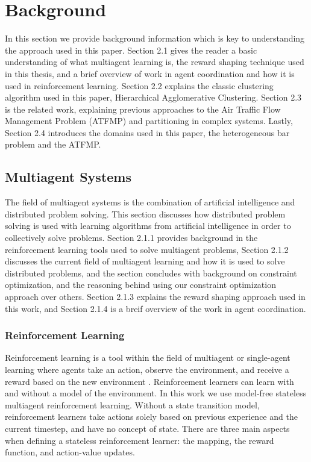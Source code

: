 \documentclass[onehalf,11pt]{beavtex}
\begin{document}
\chapter{Background}
In this section we provide background information which is key to understanding the approach used in this paper. Section 2.1 gives the reader a basic understanding of what multiagent learning is, the reward shaping technique used in this thesis, and a brief overview of work in agent coordination and how it is used in reinforcement learning. Section 2.2 explains the classic clustering algorithm used in this paper, Hierarchical Agglomerative Clustering. Section 2.3 is the related work, explaining previous approaches to the Air Traffic Flow Management Problem (ATFMP) and partitioning in complex systems. Lastly, Section 2.4 introduces the domains used in this paper, the heterogeneous bar problem and the ATFMP.

\section{Multiagent Systems}

The field of multiagent systems is the combination of artificial intelligence and distributed problem solving. This section discusses how distributed problem solving is used with learning algorithms from artificial intelligence in order to collectively solve problems. Section 2.1.1 provides background in the reinforcement learning tools used to solve multiagent problems, Section 2.1.2 discusses the current field of multiagent learning and how it is used to solve distributed problems, and the section concludes with background on constraint optimization, and the reasoning behind using our constraint optimization approach over others. Section 2.1.3 explains the reward shaping approach used in this work, and Section 2.1.4 is a breif overview of the work in agent coordination.

\subsection{Reinforcement Learning}

Reinforcement learning is a tool within the field of multiagent or single-agent learning where agents take an action, observe the environment, and receive a reward based on the new environment \cite{Sutton98reinforcementlearning}. Reinforcement learners can learn with and without a model of the environment. In this work we use model-free stateless multiagent reinforcement learning. Without a state transition model, reinforcement learners take actions solely based on previous experience and the current timestep, and have no concept of state. There are three main aspects when defining a stateless reinforcement learner: the mapping, the reward function, and action-value updates.
\end{document}
